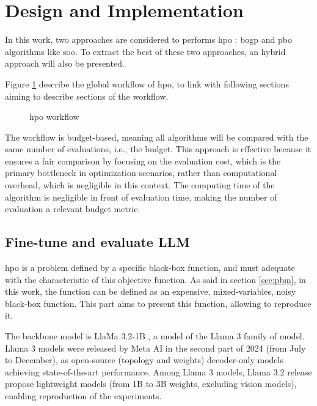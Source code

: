 \section{Design and Implementation}
\label{sec:methodo}
In this work, two approaches are considered to performs \acrfull{hpo} : \acrfull{bogp} and \acrfull{pbo} algorithms like \acrfull{soo}\cite{munos_optimistic_2011}. To extract the best of these two approaches, an hybrid approach will also be presented.

Figure \ref{fig:workflow} describe the global workflow of \acrfull{hpo}, to link with following sections aiming to describe sections of the workflow. 

\begin{figure}
    \centering
    
    \caption{ \acrshort{hpo} workflow}
    \label{fig:workflow}
\end{figure}\vspace*{-\baselineskip}

The workflow is budget-based, meaning all algorithms will be compared with the same number of evaluations, i.e., the budget. This approach is effective because it ensures a fair comparison by focusing on the evaluation cost, which is the primary bottleneck in optimization scenarios, rather than computational overhead, which is negligible in this context. The computing time of the algorithm is negligible in front of evaluation time, making the number of evaluation a relevant budget metric. 

\subsection{Fine-tune and evaluate LLM}
\label{sec:llm}
\acrshort{hpo} is a problem defined by a specific black-box function, and must adequate with the characteristic of this objective function. As said in section \ref{sec:pbm}, in this work, the function can be defined as an expensive, mixed-variables, noisy black-box function. This part aims to present this function, allowing to reproduce it. 

The backbone model is LlaMa 3.2-1B \cite{grattafiori_llama_2024}, a model of the Llama 3 family of model. Llama 3 models were released by Meta AI in the second part of 2024 (from July to December), as open-source (topology and weights) decoder-only models achieving state-of-the-art performance. Among Llama 3 models, Llama 3.2 release propose lightweight models (from 1B to 3B weights, excluding vision models), enabling reproduction of the experiments. 

